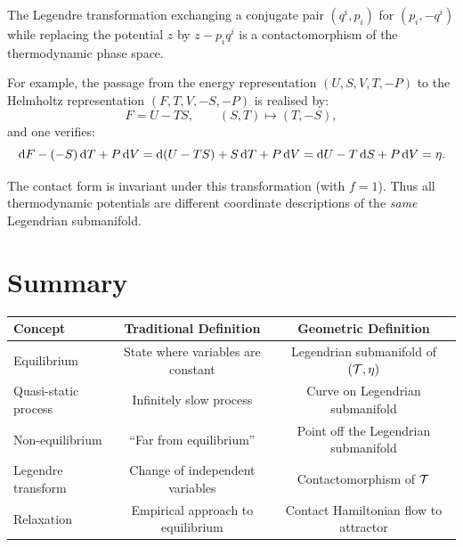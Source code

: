 \begin{proposition}
The Legendre transformation exchanging a conjugate pair $(q^i, p_i)$ for $(p_i, -q^i)$ while replacing the potential $z$ by $z - p_i q^i$ is a contactomorphism of the thermodynamic phase space.
\end{proposition}

For example, the passage from the energy representation $(U, S, V, T, -P)$ to the Helmholtz representation $(F, T, V, -S, -P)$ is realised by:
\begin{equation}
F = U - TS, \qquad (S, T) \mapsto (T, -S),
\end{equation}
and one verifies:
\begin{equation}
\dd F - (-S)\,\dd T + P\,\dd V = \dd(U - TS) + S\,\dd T + P\,\dd V = \dd U - T\,\dd S + P\,\dd V = \eta.
\end{equation}

The contact form is invariant under this transformation (with $f = 1$). Thus all thermodynamic potentials are different coordinate descriptions of the \emph{same} Legendrian submanifold.

\section{Summary}

\begin{table}[H]
\centering
\renewcommand{\arraystretch}{1.6}
\begin{tabular}{lcc}
\toprule
\textbf{Concept} & \textbf{Traditional Definition} & \textbf{Geometric Definition} \\
\midrule
Equilibrium & State where variables are constant & Legendrian submanifold of $(\mathcal{T}, \eta)$ \\
Quasi-static process & Infinitely slow process & Curve on Legendrian submanifold \\
Non-equilibrium & ``Far from equilibrium'' & Point off the Legendrian submanifold \\
Legendre transform & Change of independent variables & Contactomorphism of $\mathcal{T}$ \\
Relaxation & Empirical approach to equilibrium & Contact Hamiltonian flow to attractor \\
\bottomrule
\end{tabular}
\end{table}
